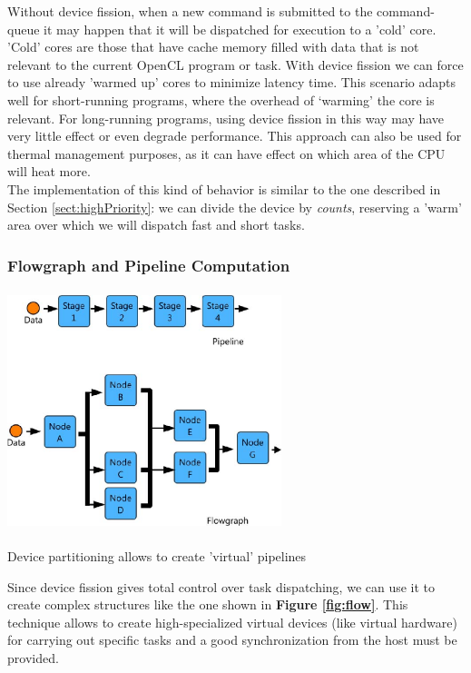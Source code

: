 Without device fission, when a new command is submitted to the command-queue it may happen that it will be dispatched for execution to a 'cold' core. 'Cold' cores are those that have cache memory filled with data that is not relevant to the current OpenCL program or task. With device fission we can force to use already 'warmed up' cores to minimize latency time.
This scenario adapts well for short-running programs, where the overhead of `warming' the core is relevant. For long-running programs, using device fission in this way may have very little effect or even degrade performance.
This approach can also be used for thermal management purposes, as it can have effect on which area of the CPU will heat more.\\
The implementation of this kind of behavior is similar to the one described in Section \ref{sect:highPriority}: we can divide the device by \textit{counts}, reserving a 'warm' area over which we will dispatch fast and short tasks.

\subsubsection{Flowgraph and Pipeline Computation} \label{sect:pipelineScenario}

\begin{figurehere}
 \centering
 \includegraphics[width=8cm, height=7cm]{./eps/flow.eps}
 \caption{Device partitioning allows to create 'virtual' pipelines}
 \label{fig:flow}
\end{figurehere}

Since device fission gives total control over task dispatching, we can use it to create complex structures like the one shown in \textbf{Figure \ref{fig:flow}}. This technique allows to create high-specialized virtual devices (like virtual hardware) for carrying out specific tasks and a good synchronization from the host must be provided. 

